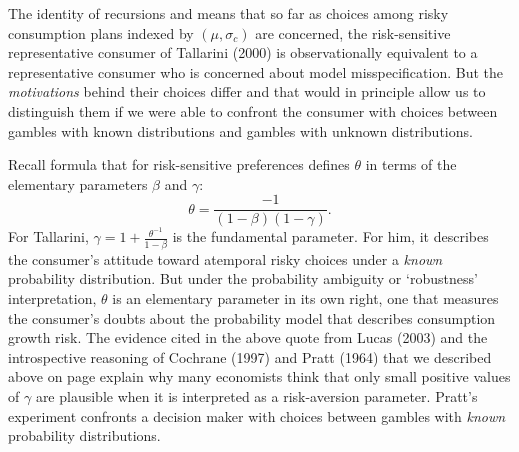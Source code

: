 The identity of recursions  and   means that so far as choices among risky
consumption plans indexed by $(\mu, \sigma_c)$ are concerned, the risk-sensitive representative consumer of Tallarini (2000)
is observationally equivalent to a representative consumer who is concerned about model misspecification.
But the {\it motivations} behind their choices differ and that would in principle  allow us to distinguish
them if we were able to confront the consumer  with choices between  gambles with known distributions and  gambles with
unknown distributions. %
%

Recall formula  that for risk-sensitive preferences defines $\theta$ in terms of the
elementary parameters $\beta$ and $\gamma$:
$$
 \theta = {\frac{-1}{(1-\beta)(1-\gamma)}}.
 $$
For Tallarini, $\gamma = 1 + {\frac{\theta^{-1}}{1-\beta}}$ is the fundamental parameter. For him, it describes the consumer's
attitude toward atemporal risky choices under a {\it known\/} probability distribution.
 But  under the probability ambiguity or `robustness' interpretation,   $\theta$ is an elementary parameter in its own right,
 one that measures the
consumer's doubts about the probability model that describes consumption growth risk.
The evidence cited in  the above quote from
Lucas (2003) and the introspective  reasoning of Cochrane (1997) and Pratt (1964) that we  described above on page 
 explain why many economists  think
that only small positive values of $\gamma$ are plausible when it is
interpreted as a risk-aversion parameter. Pratt's experiment
confronts a decision maker with choices between gambles with {\it known\/}
 probability distributions.

